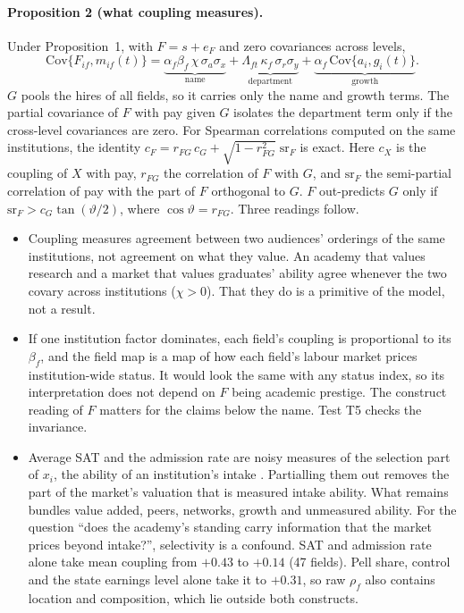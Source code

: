 \paragraph{Proposition 2 (what coupling measures).} Under Proposition~1, with $F=s+e_F$ and zero covariances
across levels,
\begin{equation}\label{eq:theory-decomp}
\mathrm{Cov}\{F_{if},m_{if}(t)\}=\underbrace{\alpha_f\beta_f\,\chi\,\sigma_a\sigma_x}_{\text{name}}
+\underbrace{\Lambda_{ft}\,\kappa_f\,\sigma_r\sigma_y}_{\text{department}}
+\underbrace{\alpha_f\,\mathrm{Cov}\{a_i,g_{i}(t)\}}_{\text{growth}} .
\end{equation}
$G$ pools the hires of all fields, so it carries only the name and growth terms. The partial covariance of $F$
with pay given $G$ isolates the department term only if the cross-level covariances are zero. For Spearman
correlations computed on the same institutions, the identity $c_F=r_{FG}\,c_G+\sqrt{1-r_{FG}^2}\;\mathrm{sr}_F$
is exact. Here $c_X$ is the coupling of $X$ with pay, $r_{FG}$ the correlation of $F$ with $G$, and
$\mathrm{sr}_F$ the semi-partial correlation of pay with the part of $F$ orthogonal to $G$. $F$ out-predicts
$G$ only if $\mathrm{sr}_F>c_G\tan(\vartheta/2)$, where $\cos\vartheta=r_{FG}$. Three readings follow.
\begin{itemize}
\item Coupling measures agreement between two audiences' orderings of the same institutions, not agreement on
what they value. An academy that values research and a market that values graduates' ability agree whenever the
two covary across institutions ($\chi>0$). That they do is a primitive of the model, not a result.
\item If one institution factor dominates, each field's coupling is proportional to its $\beta_f$, and the field
map is a map of how each field's labour market prices institution-wide status. It would look the same with any
status index, so its interpretation does not depend on $F$ being academic prestige. The construct reading of $F$
matters for the claims below the name. Test T5 checks the invariance.
\item Average SAT and the admission rate are noisy measures of the selection part of $x_i$, the ability of an
institution's intake \citep{macleod2015reputation,macleod2017big}. Partialling them out removes the part of the
market's valuation that is measured intake ability. What remains bundles value added, peers, networks, growth
and unmeasured ability. For the question ``does the academy's standing carry information that the market prices
beyond intake?'', selectivity is a confound. SAT and admission rate alone take mean coupling from $+0.43$ to
$+0.14$ (47 fields). Pell share, control and the state earnings level alone take it to $+0.31$, so raw $\rho_f$
also contains location and composition, which lie outside both constructs.
\end{itemize}

